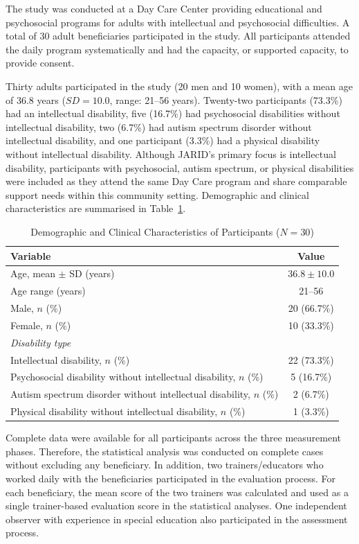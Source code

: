 \documentclass[12pt,a4paper]{article}
\begin{document}
The study was conducted at a Day Care Center providing educational and psychosocial programs for adults with intellectual and psychosocial difficulties. A total of 30 adult beneficiaries participated in the study. All participants attended the daily program systematically and had the capacity, or supported capacity, to provide consent.

Thirty adults participated in the study (20 men and 10 women), with a mean age of 36.8 years ($SD = 10.0$, range: 21--56 years). Twenty-two participants (73.3\%) had an intellectual disability, five (16.7\%) had psychosocial disabilities without intellectual disability, two (6.7\%) had autism spectrum disorder without intellectual disability, and one participant (3.3\%) had a physical disability without intellectual disability. Although JARID's primary focus is intellectual disability, participants with psychosocial, autism spectrum, or physical disabilities were included as they attend the same Day Care program and share comparable support needs within this community setting. Demographic and clinical characteristics are summarised in Table~\ref{tab:demographics}.

\begin{table}[!t]
\caption{Demographic and Clinical Characteristics of Participants ($N = 30$)}
\label{tab:demographics}
\centering
\begin{tabular}{lc}
\hline
\textbf{Variable} & \textbf{Value} \\
\hline
Age, mean $\pm$ SD (years) & $36.8 \pm 10.0$ \\
Age range (years) & 21--56 \\
Male, $n$ (\%) & 20 (66.7\%) \\
Female, $n$ (\%) & 10 (33.3\%) \\
\hline
\multicolumn{2}{l}{\textit{Disability type}} \\
Intellectual disability, $n$ (\%) & 22 (73.3\%) \\
Psychosocial disability without intellectual disability, $n$ (\%) & 5 (16.7\%) \\
Autism spectrum disorder without intellectual disability, $n$ (\%) & 2 (6.7\%) \\
Physical disability without intellectual disability, $n$ (\%) & 1 (3.3\%) \\
\hline
\end{tabular}
\end{table}

Complete data were available for all participants across the three measurement phases. Therefore, the statistical analysis was conducted on complete cases without excluding any beneficiary. In addition, two trainers/educators who worked daily with the beneficiaries participated in the evaluation process. For each beneficiary, the mean score of the two trainers was calculated and used as a single trainer-based evaluation score in the statistical analyses. One independent observer with experience in special education also participated in the assessment process.
\end{document}
